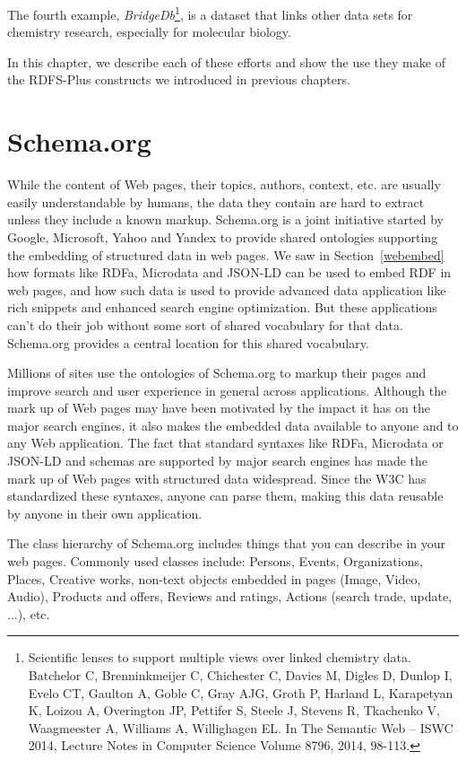 The fourth example, \emph{BridgeDb}\footnote{Scientific lenses to support multiple views over linked chemistry data. Batchelor C, Brenninkmeijer C, Chichester C, Davies M, Digles D, Dunlop I, Evelo CT, Gaulton A, Goble C, Gray AJG, Groth P, Harland L, Karapetyan K, Loizou A, Overington JP, Pettifer S, Steele J, Stevens R, Tkachenko V, Waagmeester A, Williams A, Willighagen EL. In The Semantic Web – ISWC 2014, Lecture Notes in Computer Science Volume 8796, 2014, 98-113.}, is a dataset that links other data
sets for chemistry research, especially for molecular biology. 


In this chapter, we describe each of these efforts and show the use they
make of the RDFS-Plus constructs we introduced in previous chapters.

\section{Schema.org}
\label{schema.org}
While the content of Web pages, their topics, authors, context, etc. are usually easily 
understandable by humans, the data they contain are hard to extract unless they include a 
known markup. Schema.org is a joint initiative started by Google, Microsoft, Yahoo and 
Yandex to provide shared ontologies supporting the embedding of structured data in web 
pages. We saw in Section~\ref{webembed} how formats like RDFa, Microdata and JSON-LD can 
be used to embed RDF in web pages, and how such data is used to provide
advanced data application like rich snippets and enhanced search engine optimization. 
But these applications can't do their job without some sort of shared vocabulary 
for that data.  Schema.org provides a central location for this shared vocabulary. 

Millions of sites use the ontologies of Schema.org to markup their pages and improve search and user experience 
in general across applications. Although the mark up of Web pages may have been motivated by the impact it 
has on the major search engines, it also makes the embedded data available to anyone and to any Web application. 
The fact that standard syntaxes like RDFa, Microdata or JSON-LD and schemas are supported by major search 
engines has made the mark up of Web pages with structured data  widespread.  Since the W3C has standardized these
syntaxes, anyone can parse them, making this data reusable by anyone in their own application. 


The class hierarchy of Schema.org includes things that you can describe in 
your web pages. 
Commonly used classes include: Persons, Events, Organizations, Places, Creative works, non-text objects embedded in pages (Image, Video, Audio), Products and offers, Reviews and ratings, Actions (search trade, update, ...), etc.

